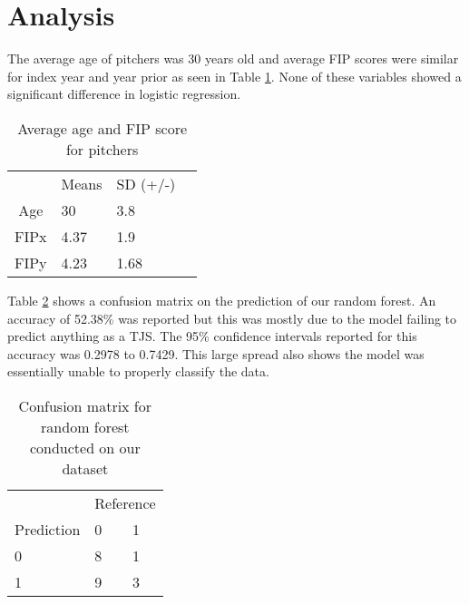 \section{Analysis}

The average age of pitchers was 30 years old and average FIP scores were similar for index year and year prior as seen in Table \ref{tbl:desc-stats}. None of these variables showed a significant difference in logistic regression.

\begin{table}[h]
\centering
\caption{Average age and FIP score for pitchers}
\label{tbl:desc-stats}
\begin{tabular}{clll}
     & Means & SD (+/-)  \\
Age  & 30    & 3.8  \\
FIPx & 4.37  & 1.9  \\
FIPy & 4.23  & 1.68
\end{tabular}
\end{table}

Table \ref{tbl:conf-matrix} shows a confusion matrix on the prediction of our random forest. An accuracy of 52.38\% was reported but this was mostly due to the model failing to predict anything as a TJS. The 95\% confidence intervals reported for this accuracy was 0.2978 to 0.7429. This large spread also shows the model was essentially unable to properly classify the data.

\begin{table}[h]
\centering
\caption{Confusion matrix for random forest conducted on our dataset}
\label{tbl:conf-matrix}
\begin{tabular}{lll}
           & \multicolumn{2}{l}{Reference} \\
Prediction & 0             & 1             \\
0          & 8             & 1             \\
1          & 9             & 3
\end{tabular}
\end{table}